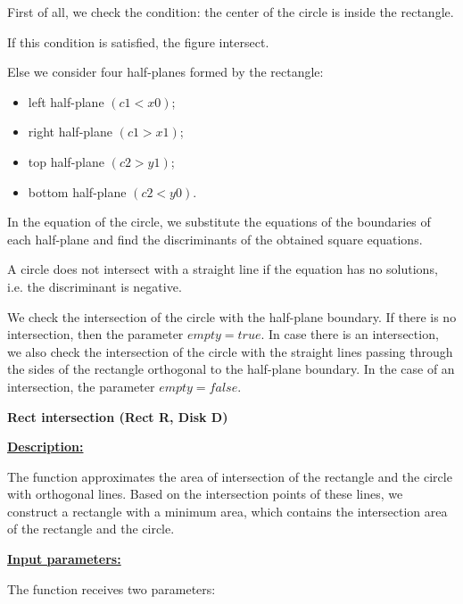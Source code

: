 \documentclass{report}
\begin{document}
	First of all, we check the condition: the center of the circle is inside the rectangle.
	
	If this condition is satisfied, the figure intersect.
	
	Else we consider four half-planes formed by the rectangle:
	
	\begin{itemize}
		\item left half-plane $(c1 < x0)$;
	 	\item right half-plane $(c1 > x1)$;
		\item top half-plane $(c2 > y1)$;
		\item bottom half-plane $(c2 < y0)$.
	\end{itemize}
	
	In the equation of the circle, we substitute the equations of the boundaries of each half-plane and find the discriminants of the obtained square equations.
	
	A circle does not intersect with a straight line if the equation has no solutions, i.e. the discriminant is negative.
	
	We check the intersection of the circle with the half-plane boundary. If there is no intersection, then the parameter $empty  =  true$. In case there is an intersection, we also check the intersection of the circle with the straight lines passing through the sides of the rectangle orthogonal to the half-plane boundary. In the case of an intersection, the parameter $empty  =  false$.





	\begin{center}{ \bfseries Rect intersection (Rect R, Disk D)}\end{center}

	\underline{\bfseries{Description:}}
	
	The function approximates the area of intersection of the rectangle and the circle with orthogonal lines. Based on the intersection points of these lines, we construct a rectangle with a minimum area, which contains the intersection area of the rectangle and the circle.
	 
	{\bfseries\underline{Input parameters:}}
	
	The function receives two parameters:
	
\end{document}
